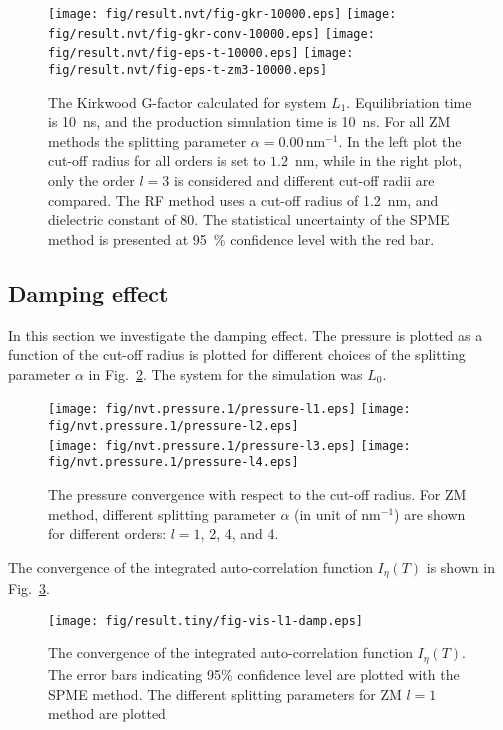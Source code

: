 \documentclass[aip,jcp,a4paper,preprint,unsortedaddress,onecolumn,fleqn]{revtex4-1}
\newcommand{\systemlb}{L_1}
\begin{document}
\begin{figure}
  \centering
  \texttt{[image: fig/result.nvt/fig-gkr-10000.eps]}
  \texttt{[image: fig/result.nvt/fig-gkr-conv-10000.eps]}
  \texttt{[image: fig/result.nvt/fig-eps-t-10000.eps]}
  \texttt{[image: fig/result.nvt/fig-eps-t-zm3-10000.eps]}
  \caption{The Kirkwood G-factor calculated for system $\systemlb$. Equilibriation time is 10~ns, and the production simulation time is 10~ns.
    For all ZM methods the splitting parameter $\alpha = 0.00\,\textrm{nm}^{-1}$.
    In the left plot the cut-off radius for all orders is set to $1.2$~nm, while
    in the right plot, only the order $l=3$ is considered and different cut-off radii are compared.
    The RF method uses a cut-off radius of 1.2~nm, and dielectric constant of 80.
    The statistical uncertainty of the SPME method is presented at 95~\% confidence level with the red bar.
  }
  \label{fig:tmp3}
\end{figure}






\subsection{Damping effect}

In this section we investigate the damping effect. The pressure is plotted as a function of  the cut-off radius is plotted for different choices of
the splitting parameter $\alpha$ in Fig.~\ref{fig:damp-pres}. The system for the simulation was $L_0$.
\begin{figure}
  \centering
  \texttt{[image: fig/nvt.pressure.1/pressure-l1.eps]}
  \texttt{[image: fig/nvt.pressure.1/pressure-l2.eps]}\\
  \texttt{[image: fig/nvt.pressure.1/pressure-l3.eps]}
  \texttt{[image: fig/nvt.pressure.1/pressure-l4.eps]}
  \caption{The pressure convergence with respect to the cut-off radius.
    For ZM method, different splitting parameter $\alpha$ (in unit of $\textrm{nm}^{-1}$) are shown for different orders:  $l=1$, 2, 4, and 4.
  }
  \label{fig:damp-pres}
\end{figure}

The convergence of the integrated auto-correlation function $I_\eta(T) $ is shown in Fig.~\ref{fig:damp-vis-l1}.
\begin{figure}
  \centering
  \texttt{[image: fig/result.tiny/fig-vis-l1-damp.eps]}
  \caption{The convergence of the integrated auto-correlation function $I_\eta(T) $. The error bars indicating 95\% confidence level are plotted with the SPME method. The different splitting parameters for ZM $l=1$ method are plotted}
  \label{fig:damp-vis-l1}
\end{figure}
\end{document}
